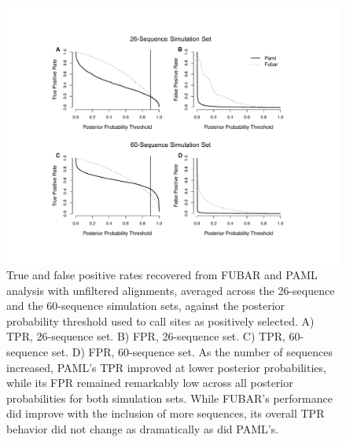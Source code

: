 \documentclass[10pt]{article}
\begin{document}
\begin{figure}[H]
\label{tprfpr}
\centerline{\includegraphics[width=7in]{Figures/tprfpr.pdf}}
\caption{True and false positive rates recovered from FUBAR and PAML analysis with unfiltered alignments, averaged across the 26-sequence and the 60-sequence simulation sets, against the posterior probability threshold used to call sites as positively selected. A) TPR, 26-sequence set. B) FPR, 26-sequence set. C) TPR, 60-sequence set. D) FPR, 60-sequence set.  As the number of sequences increased, PAML's TPR improved at lower posterior probabilities, while its FPR remained remarkably low across all posterior probabilities for both simulation sets. While FUBAR's performance did improve with the inclusion of more sequences, its overall TPR behavior did not change as dramatically as did PAML's.}
\end{figure}
\end{document}
